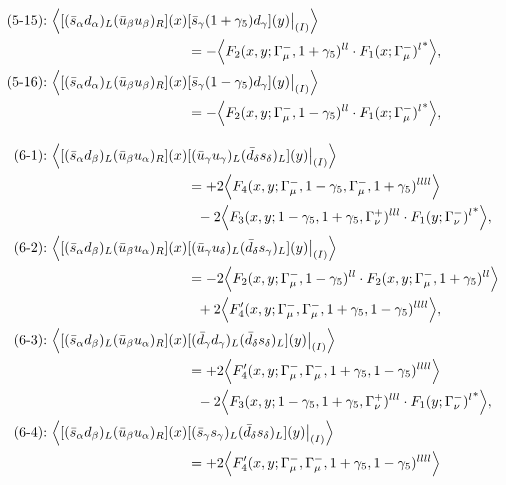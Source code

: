 \begin{align}
\mbox{(5-15):}\ 
\Big\langle
[(\bar s_\alpha d_\alpha)_L(\bar u_\beta u_\beta)_R](x)&
[\bar s_\gamma (1 + \gamma_5) d_\gamma](y)\big|_{(I)}
\Big\rangle
\notag\\*
&=
 - \Big\langle F_2(x,y;\Gamma_\mu^-,1+\gamma_5)^{ll} \cdot {F_1(x;\Gamma_\mu^-)^l}^*\Big\rangle,
\\
\mbox{(5-16):}\ 
\Big\langle
[(\bar s_\alpha d_\alpha)_L(\bar u_\beta u_\beta)_R](x)&
[\bar s_\gamma (1 - \gamma_5) d_\gamma](y)\big|_{(I)}
\Big\rangle
\notag\\*
&=
 - \Big\langle F_2(x,y;\Gamma_\mu^-,1-\gamma_5)^{ll} \cdot {F_1(x;\Gamma_\mu^-)^l}^*\Big\rangle,
\\[3mm]
\mbox{(6-1):}\ 
\Big\langle
[(\bar s_\alpha d_\beta)_L(\bar u_\beta u_\alpha)_R](x)&
[(\bar u_\gamma u_\gamma)_L(\bar d_\delta s_\delta)_L](y)\big|_{(I)}
\Big\rangle
\notag\\*
&=
 + 2\Big\langle F_4(x,y;\Gamma_\mu^-,1-\gamma_5,\Gamma_\mu^-,1+\gamma_5)^{llll}\Big\rangle
\notag\\*&\ \ 
-2\Big\langle F_3(x,y;1-\gamma_5,1+\gamma_5,\Gamma_\nu^+)^{lll} \cdot {F_1(y;\Gamma_\nu^-)^l}^*\Big\rangle,
\\
\mbox{(6-2):}\ 
\Big\langle
[(\bar s_\alpha d_\beta)_L(\bar u_\beta u_\alpha)_R](x)&
[(\bar u_\gamma u_\delta)_L(\bar d_\delta s_\gamma)_L](y)\big|_{(I)}
\Big\rangle
\notag\\*
&=
-2\Big\langle F_2(x,y;\Gamma_\mu^-,1-\gamma_5)^{ll} \cdot F_2(x,y;\Gamma_\mu^-,1+\gamma_5)^{ll}\Big\rangle
\notag\\*&\ \ 
 + 2\Big\langle F_4'(x,y;\Gamma_\mu^-,\Gamma_\mu^-,1+\gamma_5,1-\gamma_5)^{llll}\Big\rangle,
\\
\mbox{(6-3):}\ 
\Big\langle
[(\bar s_\alpha d_\beta)_L(\bar u_\beta u_\alpha)_R](x)&
[(\bar d_\gamma d_\gamma)_L(\bar d_\delta s_\delta)_L](y)\big|_{(I)}
\Big\rangle
\notag\\*
&=
 + 2\Big\langle F_4'(x,y;\Gamma_\mu^-,\Gamma_\mu^-,1+\gamma_5,1-\gamma_5)^{llll}\Big\rangle
\notag\\*&\ \ 
-2\Big\langle F_3(x,y;1-\gamma_5,1+\gamma_5,\Gamma_\nu^+)^{lll} \cdot {F_1(y;\Gamma_\nu^-)^l}^*\Big\rangle,
\\
\mbox{(6-4):}\ 
\Big\langle
[(\bar s_\alpha d_\beta)_L(\bar u_\beta u_\alpha)_R](x)&
[(\bar s_\gamma s_\gamma)_L(\bar d_\delta s_\delta)_L](y)\big|_{(I)}
\Big\rangle
\notag\\*
&=
 + 2\Big\langle F_4'(x,y;\Gamma_\mu^-,\Gamma_\mu^-,1+\gamma_5,1-\gamma_5)^{llll}\Big\rangle
\notag\\*&\ \ 

\end{align}
